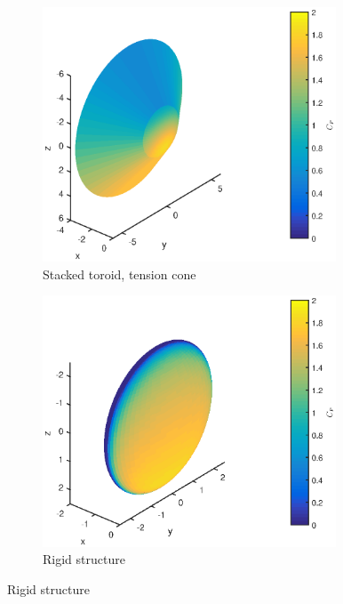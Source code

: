 \begin{figure}[h]
	\centering
	\begin{subfigure}[b]{0.49\textwidth}
		\includegraphics[width=0.96\textwidth]{./Figure/aero_model/irve.eps}
		\caption{Stacked toroid, tension cone}
		\label{fig:cpstackedtoroid}
	\end{subfigure}
	\begin{subfigure}[b]{0.49\textwidth}
		\includegraphics[width=0.96\textwidth]{./Figure/aero_model/rigid.eps}
		\caption{Rigid structure}
		\label{fig:cprigid}
	\end{subfigure}

\end{figure}
